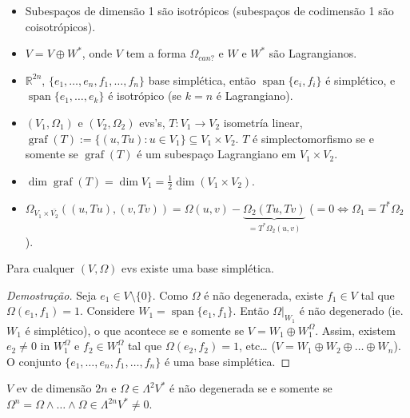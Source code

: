 \begin{example}\leavevmode 
	\begin{itemize}
		\item Subespa\c cos de dimens\~ao 1 s\~ao isotr\'opicos (subespa\c cos de codimens\~ao 1 s\~ao\\ coisotr\'opicos).
		\item $V=V\oplus W^{*}$, onde $V$ tem a forma $\Omega_{can?}$ e $W$ e $W^{*}$ s\~ao Lagrangianos.
		\item $\mathbb{R}^{2n}$, $\{e_1,\ldots,e_n,f_1,\ldots,f_n\} $ base simpl\'etica, ent\~ao $\operatorname{span} \{e_i,f_i\}$ \'e simpl\'etico, e \\$\operatorname{span} \{e_1,\ldots,e_k\} $ \'e isotr\'opico (se $k=n$ \'e Lagrangiano).
		\item $(V_1,\Omega_1)$ e $(V_2,\Omega_2)$ evs's, $T:V_1\to V_2$ isometr\'ia linear, $\operatorname{graf}(T):=\{(u,Tu):u\in V_1\} \subseteq V_1\times V_2$. $T$ \'e simplectomorfismo se e somente se $\operatorname{graf}(T)$ \'e um subespa\c co Lagrangiano em $V_1\times V_2$.
		\item $\dim \operatorname{graf}(T)=\dim V_1=\frac{1}{2}\dim (V_1\times V_2)$.
		\item $\Omega_{V_1\times \bar{V_2}}((u,Tu),(v,Tv))=\Omega(u,v)-\underbrace{\Omega_2(Tu,Tv)}_{=T^{*} \Omega_2(u,v)}$ ($=0\iff \Omega_1=T^{*} \Omega_2$).
	\end{itemize}
\end{example}

\begin{thm}\leavevmode
	Para cualquer $(V,\Omega)$ evs existe uma base simpl\'etica.
\end{thm}
\begin{proof}[Demostra\c c\~ao]
	Seja $e_1\in V\setminus \{0\} $. Como $\Omega$ \'e n\~ao degenerada, existe $f_1\in V$ tal que $\Omega(e_1,f_1)=1$. Considere $W_1=\operatorname{span}\{e_1,f_1\} $. Ent\~ao $\Omega|_{W_1}$ \'e n\~ao degenerado (ie. $W_1$ \'e simpl\'etico), o que acontece se e somente se $V=W_1\oplus W_1^{\Omega}$. Assim, existem $e_2\neq 0$ in $W_1^{\Omega}$ e $f_2\in W_1^{\Omega}$ tal que $\Omega(e_2,f_2)=1$, etc… ($V=W_1\oplus  W_2\oplus \ldots\oplus W_n$). O conjunto $\{e_1,\ldots,e_n,f_1,\ldots,f_n\} $ \'e uma base simpl\'etica.
\end{proof}

\begin{exercise}
	$V$ ev de dimens\~ao $2n$ e $\Omega\in \Lambda^{2} V^{*}$ \'e n\~ao degenerada se e somente se $\Omega^{n}=\Omega\wedge \ldots\wedge \Omega\in \Lambda^{2n} V^{*} \neq 0$.
\end{exercise}

